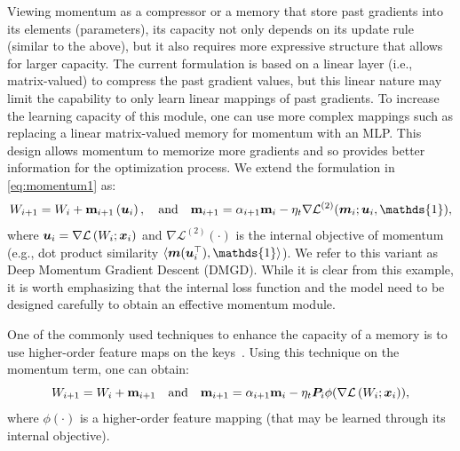 {Viewing momentum as a compressor or a memory that store past gradients into its elements (parameters), its capacity not only depends on its update rule (similar to the above), but it also requires more expressive structure that allows for larger capacity. The current formulation is based on a linear layer (i.e., matrix-valued) to compress the past gradient values, but this linear nature may limit the capability to only learn linear mappings of past gradients. To increase the learning capacity of this module, one can use more complex mappings  such as replacing a linear matrix-valued memory for momentum with an MLP. This design allows momentum to memorize more gradients and so provides better information for the optimization process. We extend the formulation in \autoref{eq:momentum1} as:
\begin{equation}\label{eq:deep-momentum}
    W_{i+1} = W_i + \mathbf{m}_{i+1}\left(\mb{u}_i\right), \quad \textrm{and}\quad 
    \mathbf{m}_{i+1} = \alpha_{i+1} \mathbf{m}_{i} - \eta_t \nabla \mathcal{L}^{(2)}(\vm_i; \mb{u}_i, \mathds{1}), 
\end{equation}
where $\boldsymbol{u}_i = \nabla \mathcal{L}\left(W_{i};\boldsymbol{x}_i\right)$ and $\nabla \mathcal{L}^{(2)}(\cdot)$ is the internal objective of momentum (e.g., dot product similarity $\inner{\vm(\mb{u}_i^{\top})}{\mathds{1}}$). We refer to this variant as Deep Momentum Gradient Descent {(DMGD)}. While it is clear from this example, it is worth emphasizing that the internal loss function and the model need to be designed carefully to obtain an effective momentum module. 


 One of the commonly used techniques to enhance the capacity of a memory is to use higher-order feature maps on the keys~\citep{polysketchformer-kacham2024, katharopoulos2020transformers}. Using this technique on the momentum term, one can obtain: 
\begin{equation}
    W_{i+1} = W_i + \mathbf{m}_{i+1}\quad \textrm{and}\quad
    \mathbf{m}_{i+1} = \alpha_{i+1} \mathbf{m}_{i} - \eta_t \boldsymbol{P}_i  \phi(\nabla \mathcal{L}\left(W_{i};\boldsymbol{x}_i\right)), 
\end{equation}
where $\phi(\cdot)$ is a higher-order feature mapping (that may be learned through its internal objective). 


}
